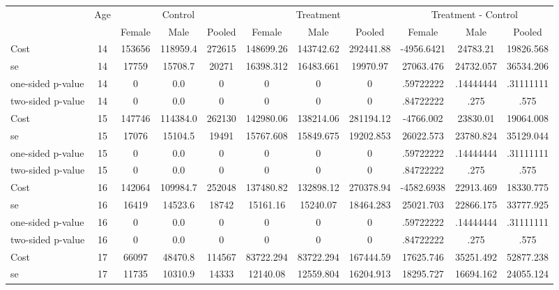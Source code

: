 \begin{tabular}{lcccccccccc} \hline \hline
 &Age & \multicolumn{3}{c}{Control} & \multicolumn{3}{c}{Treatment} & \multicolumn{3}{c}{Treatment - Control} \\ 
& & Female  & Male  & Pooled  & Female  & Male  & Pooled  & Female  & Male  & Pooled  \\  \hline  
Cost 			  &        14 &    153656 &  118959.4 &    272615 & 148699.26 & 143742.62 & 292441.88 & -4956.6421 & 24783.21 & 19826.568 \\  
se 				 &        14 &     17759 &   15708.7 &     20271 & 16398.312 & 16483.661 & 19970.97 & 27063.476 & 24732.057 & 36534.206 \\  
one-sided p-value&        14 &         0 &       0.0 &         0 & 0 & 0 & 0 & .59722222 & .14444444 & .31111111 \\  
two-sided p-value&        14 &         0 &       0.0 &         0 & 0 & 0 & 0 & .84722222 & .275 & .575 \\  
Cost 			  &        15 &    147746 &  114384.0 &    262130 & 142980.06 & 138214.06 & 281194.12 & -4766.002 & 23830.01 & 19064.008 \\  
se 				 &        15 &     17076 &   15104.5 &     19491 & 15767.608 & 15849.675 & 19202.853 & 26022.573 & 23780.824 & 35129.044 \\  
one-sided p-value&        15 &         0 &       0.0 &         0 & 0 & 0 & 0 & .59722222 & .14444444 & .31111111 \\  
two-sided p-value&        15 &         0 &       0.0 &         0 & 0 & 0 & 0 & .84722222 & .275 & .575 \\  
Cost 			  &        16 &    142064 &  109984.7 &    252048 & 137480.82 & 132898.12 & 270378.94 & -4582.6938 & 22913.469 & 18330.775 \\  
se 				 &        16 &     16419 &   14523.6 &     18742 & 15161.16 & 15240.07 & 18464.283 & 25021.703 & 22866.175 & 33777.925 \\  
one-sided p-value&        16 &         0 &       0.0 &         0 & 0 & 0 & 0 & .59722222 & .14444444 & .31111111 \\  
two-sided p-value&        16 &         0 &       0.0 &         0 & 0 & 0 & 0 & .84722222 & .275 & .575 \\  
Cost 			  &        17 &     66097 &   48470.8 &    114567 & 83722.294 & 83722.294 & 167444.59 & 17625.746 & 35251.492 & 52877.238 \\  
se 				  &        17 &     11735 &   10310.9 &     14333 & 12140.08 & 12559.804 & 16204.913 & 18295.727 & 16694.162 & 24055.124 \\  

\end{tabular}
